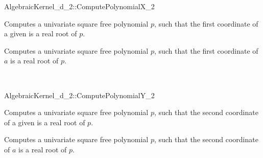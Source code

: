 \begin{ccRefFunctionObjectConcept}{AlgebraicKernel_d_2::ComputePolynomialX_2}

\ccDefinition
Computes a univariate square free polynomial $p$, such that the first coordinate of 
a given  is a real root of $p$.
 
\ccRefines 
{}  

\ccTypes
{}
\ccGlue
{}

\ccOperations
{}

{Computes a univariate square free polynomial $p$, such that the first 
coordinate of $a$ is a real root of $p$.}


\ccSeeAlso
{}\\

\end{ccRefFunctionObjectConcept}


\begin{ccRefFunctionObjectConcept}{AlgebraicKernel_d_2::ComputePolynomialY_2}

\ccDefinition
Computes a univariate square free polynomial $p$, such that the second coordinate of 
a given  is a real root of $p$.
 
\ccRefines 
{}  

\ccTypes
{}
\ccGlue
{}

\ccOperations
{}

{Computes a univariate square free polynomial $p$, such that the second coordinate of $a$ 
is a real root of $p$.}

\ccSeeAlso
{}\\

\end{ccRefFunctionObjectConcept}